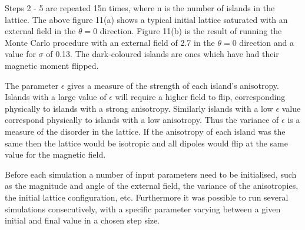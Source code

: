 Steps 2 - 5 are repeated 15n times, where n is the number of islands in the lattice.  The above figure 11(a) shows a typical initial lattice saturated with an external field in the $\theta = 0$ direction. Figure 11(b) is the result of running the Monte Carlo procedure with an external field of 2.7 in the $\theta = 0$ direction and a value for $\sigma$ of 0.13. The dark-coloured islands are ones which have had their magnetic moment flipped.
\par
The parameter $\epsilon$ gives a measure of the strength of each island's anisotropy. Islands with a large value of $\epsilon$ will require a higher field to flip, corresponding physically to islands with a strong anisotropy. Similarly islands with a low $\epsilon$ value correspond physically to islands with a low anisotropy. Thus the variance of $\epsilon$ is a measure of the disorder in the lattice.  If the anisotropy of each island was the same then the lattice would be isotropic and all dipoles would flip at the same value for the magnetic field.
\par
Before each simulation a number of input parameters need to be initialised, such as the magnitude and angle of the external field, the variance of the anisotropies, the initial lattice configuration, etc. Furthermore it was possible to run several simulations consecutively, with a specific parameter varying between
a given initial and final value in a chosen step size.
